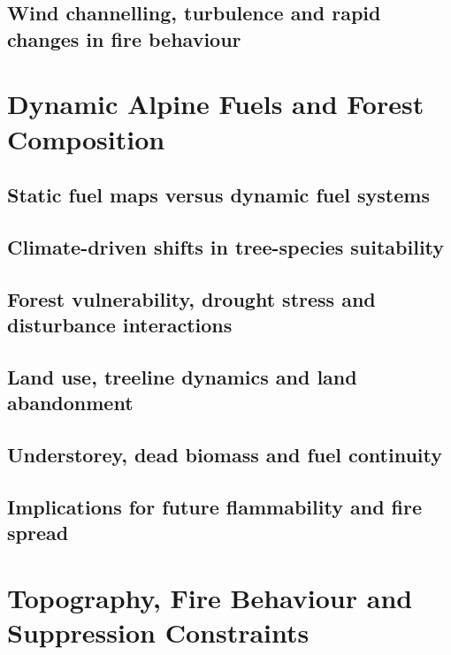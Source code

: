 \documentclass[11pt,a4paper]{article}
\begin{document}
\subsection{Wind channelling, turbulence and rapid changes in fire behaviour}


\section{Dynamic Alpine Fuels and Forest Composition}

\subsection{Static fuel maps versus dynamic fuel systems}

\subsection{Climate-driven shifts in tree-species suitability}

\subsection{Forest vulnerability, drought stress and disturbance interactions}

\subsection{Land use, treeline dynamics and land abandonment}

\subsection{Understorey, dead biomass and fuel continuity}

\subsection{Implications for future flammability and fire spread}


\section{Topography, Fire Behaviour and Suppression Constraints}
\end{document}
